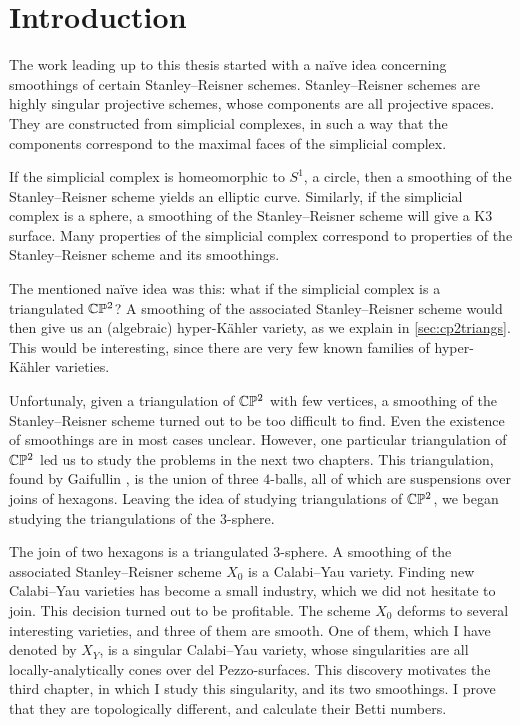 \chapter{Introduction}
\label{sec:intro}

The work leading up to this thesis started with a naïve idea concerning smoothings of certain Stanley--Reisner schemes. Stanley--Reisner schemes are highly singular projective schemes, whose components are all projective spaces. They are constructed from simplicial complexes, in such a way that the components correspond to the maximal faces of the simplicial complex. 

If the simplicial complex is homeomorphic to $S^1$, a circle, then a smoothing of the Stanley--Reisner scheme yields an elliptic curve. Similarly, if the simplicial complex is a sphere, a smoothing of the Stanley--Reisner scheme will give a K3 surface. Many properties of the simplicial complex correspond to properties of the Stanley--Reisner scheme and its smoothings. 

The mentioned naïve idea was this: what if the simplicial complex is a triangulated $\mathbb{C} \mathbb{P}^2$? A smoothing of the associated Stanley--Reisner scheme would then give us an (algebraic) hyper-Kähler variety, as we explain in \cref{sec:cp2triangs}. This would be interesting, since there are very few known families of hyper-Kähler varieties.

Unfortunaly, given a triangulation of $\mathbb{C} \mathbb{P}^2$ with few vertices, a smoothing of the Stanley--Reisner scheme turned out to be too difficult to find. Even the existence of smoothings are in most cases unclear. However, one particular triangulation of $\mathbb{C} \mathbb{P}^2$ led us to study the problems in the next two chapters. This triangulation, found by Gaifullin \cite{cp2_15_chess}, is the union of three $4$-balls, all of which are suspensions over joins of hexagons. Leaving the idea of studying triangulations of $\mathbb{C} \mathbb{P}^2$, we began studying the triangulations of the $3$-sphere.

The join of two hexagons is a triangulated $3$-sphere. A smoothing of the associated Stanley--Reisner scheme $X_0$ is a Calabi--Yau variety. Finding new Calabi--Yau varieties has become a small industry, which we did not hesitate to join. This decision turned out to be profitable. The scheme $X_0$ deforms to several interesting varieties, and three of them are smooth. One of them, which I have denoted by $X_Y$, is a singular Calabi--Yau variety, whose singularities are all locally-analytically cones over del Pezzo-surfaces. This discovery motivates the third chapter, in which I study this singularity, and its two smoothings. I prove that they are topologically different, and calculate their Betti numbers.

